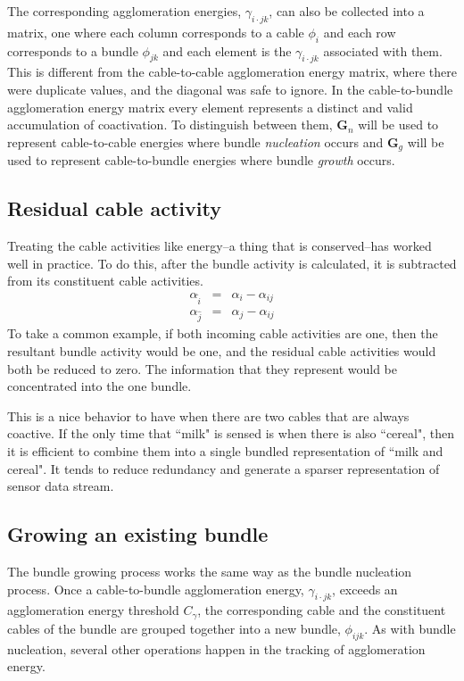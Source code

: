 The corresponding agglomeration energies, $\gamma_{i\cdot jk}$,
can also be collected
into a matrix, one where each column corresponds to a cable $\phi_i$
and each row corresponds to a bundle $\phi_{jk}$ and each element is
the $\gamma_{i \cdot jk}$ associated with them. This is different from the
cable-to-cable agglomeration energy matrix, where there were duplicate
values, and the diagonal was safe to ignore. In the cable-to-bundle
agglomeration energy matrix every element represents a distinct and valid
accumulation of coactivation. To distinguish between them,
$\mathbf{G}_n$ will be used to represent cable-to-cable energies where
bundle \textit{nucleation} occurs and $\mathbf{G}_g$ will be used to
represent cable-to-bundle energies where bundle \textit{growth} occurs.

\subsection{Residual cable activity}
\label{subsec:algoresidual}

Treating the cable activities like energy--a thing that is conserved--has
worked well in practice. To do this, after the bundle activity is
calculated, it is subtracted from its constituent cable activities.
\begin{eqnarray}
\alpha_{\hat{i}} &=& \alpha_i - \alpha_{ij}\\
\alpha_{\hat{j}} &=& \alpha_j - \alpha_{ij}
\end{eqnarray}
To take a common example, if both incoming cable activities are one,
then the resultant bundle activity would be one, and the residual cable
activities would both be reduced to zero. The information that they
represent would be concentrated into the one bundle.

This is a nice behavior to have when there are two cables
that are always coactive. If the only time that ``milk" is sensed is when
there is also ``cereal", then it is efficient to combine them into
a single bundled representation of ``milk and cereal". It tends to
reduce redundancy and generate a sparser representation of sensor data
stream.

\subsection{Growing an existing bundle}
\label{subsec:algogrowing}

The bundle growing process works the same way as the bundle nucleation
process. Once a cable-to-bundle agglomeration energy, $\gamma_{i \cdot jk}$,
exceeds an agglomeration energy threshold $C_\gamma$, the corresponding
cable and the constituent cables of the bundle are grouped together into
a new bundle, $\phi_{ijk}$. As with bundle nucleation, several other
operations happen in the tracking of agglomeration energy.

